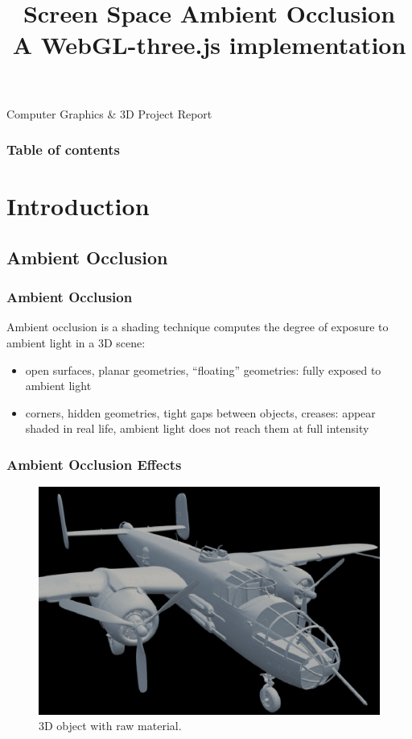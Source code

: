 \documentclass{beamer}
\title[]{Screen Space Ambient Occlusion \\\small A WebGL-three.js implementation}
\author[Ivan Prosperi]{
    \usebox{\authbox}}
\institute[]{Universit\`a degli Studi di Firenze}
\date{}
\begin{document}

\begin{frame}
    \titlepage
    \centering
    Computer Graphics \& 3D Project Report
\end{frame}

\begin{frame}
    \frametitle{Table of contents}
    \tableofcontents[subsubsectionstyle=hide]
\end{frame}

\section{Introduction}

\subsection{Ambient Occlusion}

\begin{frame}
\frametitle{Ambient Occlusion}
Ambient occlusion is a shading technique computes the degree of exposure to ambient light in a 3D scene:
\begin{itemize}
    \item open surfaces, planar geometries, ``floating'' geometries: fully exposed to ambient light
    \item corners, hidden geometries, tight gaps between objects, creases: appear shaded in real life, ambient light does not reach them at full intensity
\end{itemize}

\end{frame}

\begin{frame}
\frametitle{Ambient Occlusion Effects}
\begin{figure}
    \centering
    \includegraphics[width=0.8\linewidth]{images/B-25_raw.png}
    \caption{3D object with raw material.\footnotemark}
\end{figure}

\vspace*{-8px}
\end{frame}
\end{document}
